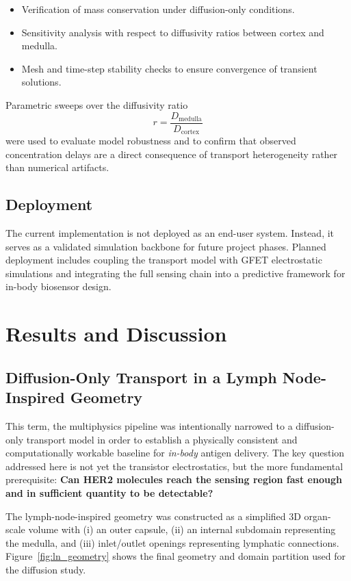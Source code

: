 \documentclass[12pt,a4paper]{report}
\begin{document}
\begin{itemize}
    \item Verification of mass conservation under diffusion-only conditions.
    \item Sensitivity analysis with respect to diffusivity ratios between cortex and medulla.
    \item Mesh and time-step stability checks to ensure convergence of transient solutions.
\end{itemize}

Parametric sweeps over the diffusivity ratio
\begin{equation}
r = \frac{D_{\text{medulla}}}{D_{\text{cortex}}}
\end{equation}
were used to evaluate model robustness and to confirm that observed concentration delays are a direct consequence of transport heterogeneity rather than numerical artifacts.

\section{Deployment}

The current implementation is not deployed as an end-user system. Instead, it serves as a validated simulation backbone for future project phases. Planned deployment includes coupling the transport model with GFET electrostatic simulations and integrating the full sensing chain into a predictive framework for in-body biosensor design.



\chapter{Results and Discussion}

\section{Diffusion-Only Transport in a Lymph Node-Inspired Geometry}

This term, the multiphysics pipeline was intentionally narrowed to a diffusion-only transport model in order to establish a physically consistent and computationally workable baseline for \textit{in-body} antigen delivery. The key question addressed here is not yet the transistor electrostatics, but the more fundamental prerequisite: \textbf{Can HER2 molecules reach the sensing region fast enough and in sufficient quantity to be detectable?}

The lymph-node-inspired geometry was constructed as a simplified 3D organ-scale volume with (i) an outer capsule, (ii) an internal subdomain representing the medulla, and (iii) inlet/outlet openings representing lymphatic connections. Figure~\ref{fig:ln_geometry} shows the final geometry and domain partition used for the diffusion study.
\end{document}

